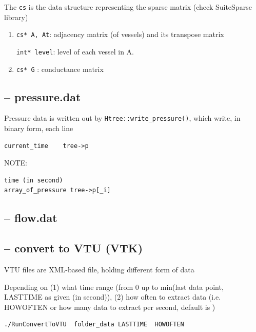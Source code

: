 The \verb!cs! is the data structure representing the sparse matrix (check
SuiteSparse library)
\begin{enumerate}
  \item \verb!cs* A, At!: adjacency matrix (of vessels) and its transpose matrix
  
\verb!int* level!: level of each vessel in A.
  
  \item \verb!cs* G! : conductance matrix
  
  
\end{enumerate}

\subsection{-- pressure.dat}

Pressure data is written out by \verb!Htree::write_pressure()!, which write, in
binary form, each line
\begin{verbatim}
current_time    tree->p
\end{verbatim}
NOTE:
\begin{verbatim}
time (in second)    
array_of_pressure tree->p[_i]
\end{verbatim}



\subsection{-- flow.dat}



\subsection{-- convert to VTU (VTK)}

VTU files are XML-based file, holding different form of data

Depending on (1) what time range (from 0 up to min(last data point, LASTTIME as
given (in second)), (2) how often to extract data (i.e. HOWOFTEN or how many
data to extract per second, default is )

\begin{verbatim}
./RunConvertToVTU  folder_data LASTTIME  HOWOFTEN
\end{verbatim}

